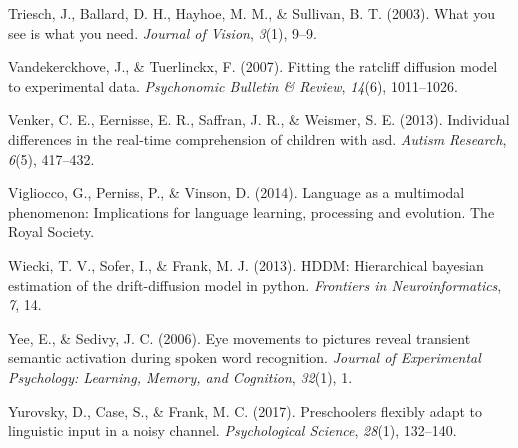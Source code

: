 \documentclass[,man,floatsintext]{apa6}
\begin{document}
\hypertarget{ref-triesch2003you}{}
Triesch, J., Ballard, D. H., Hayhoe, M. M., \& Sullivan, B. T. (2003).
What you see is what you need. \emph{Journal of Vision}, \emph{3}(1),
9--9.

\hypertarget{ref-vandekerckhove2007fitting}{}
Vandekerckhove, J., \& Tuerlinckx, F. (2007). Fitting the ratcliff
diffusion model to experimental data. \emph{Psychonomic Bulletin \&
Review}, \emph{14}(6), 1011--1026.

\hypertarget{ref-venker2013individual}{}
Venker, C. E., Eernisse, E. R., Saffran, J. R., \& Weismer, S. E.
(2013). Individual differences in the real-time comprehension of
children with asd. \emph{Autism Research}, \emph{6}(5), 417--432.

\hypertarget{ref-vigliocco2014language}{}
Vigliocco, G., Perniss, P., \& Vinson, D. (2014). Language as a
multimodal phenomenon: Implications for language learning, processing
and evolution. The Royal Society.

\hypertarget{ref-wiecki2013hddm}{}
Wiecki, T. V., Sofer, I., \& Frank, M. J. (2013). HDDM: Hierarchical
bayesian estimation of the drift-diffusion model in python.
\emph{Frontiers in Neuroinformatics}, \emph{7}, 14.

\hypertarget{ref-yee2006eye}{}
Yee, E., \& Sedivy, J. C. (2006). Eye movements to pictures reveal
transient semantic activation during spoken word recognition.
\emph{Journal of Experimental Psychology: Learning, Memory, and
Cognition}, \emph{32}(1), 1.

\hypertarget{ref-yurovsky2017preschoolers}{}
Yurovsky, D., Case, S., \& Frank, M. C. (2017). Preschoolers flexibly
adapt to linguistic input in a noisy channel. \emph{Psychological
Science}, \emph{28}(1), 132--140.

\clearpage
\makeatletter
\efloat@restorefloats
\makeatother
\end{document}
